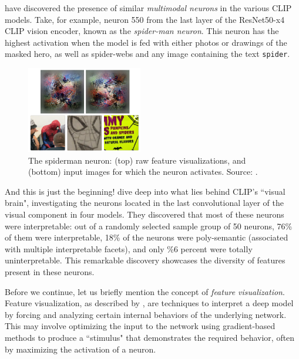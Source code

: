 \documentclass{article}
\begin{document}
\medskip
\noindent
\citet{goh2021multimodal} have discovered the presence of similar \emph{multimodal neurons} in the various CLIP models. Take, for example, neuron 550 from the last layer of the ResNet50-x4 CLIP vision encoder, known as the \emph{spider-man neuron}. This neuron has the highest activation when the model is fed with either photos or drawings of the masked hero, as well as spider-webs and any image containing the text \texttt{spider}.

\begin{figure}
    \centering
    \vspace{-2mm}
    \includegraphics[width=0.45\textwidth]{figures/spiderman_neuron.png}
    \caption{
        The spiderman neuron: (top) raw feature visualizations, and (bottom) input images for which the neuron activates. Source: \citet{goh2021multimodal}.
    }
    \label{fig:spiderman_neuron}
    \vspace{-8mm}
\end{figure}

\medskip
\noindent
And this is just the beginning! \citet{goh2021multimodal} dive deep into what lies behind CLIP's ``visual brain", investigating the neurons located in the last convolutional layer of the visual component in four models. They discovered that most of these neurons were interpretable: out of a randomly selected sample group of 50 neurons, 76\% of them were interpretable, 18\% of the neurons were poly-semantic (associated with multiple interpretable facets), and only \%6 percent were totally uninterpretable. This remarkable discovery showcases the diversity of features present in these neurons.

\medskip
\noindent
Before we continue, let us briefly mention the concept of \emph{feature visualization}. Feature visualization, as described by \citet{olah2017feature}, are techniques to interpret a deep model by forcing and analyzing certain internal behaviors of the underlying network. This may involve optimizing the input to the network using gradient-based methods to produce a ``stimulus" that demonstrates the required behavior, often by maximizing the activation of a neuron.
\end{document}
